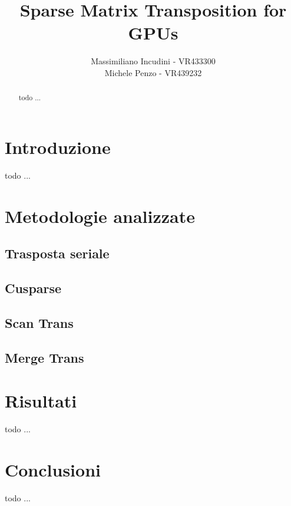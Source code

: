\documentclass[]{IEEEtran}
\title{Sparse Matrix Transposition for GPUs}
\author{Massimiliano Incudini - VR433300\\Michele Penzo - VR439232}
\begin{document}
\maketitle

\begin{abstract}
todo ...
\end{abstract}


\section{Introduzione}
todo ...

\section{Metodologie analizzate}
\subsection{Trasposta seriale}

\subsection{Cusparse}

\subsection{Scan Trans}

\subsection{Merge Trans}


\section{Risultati}
todo ...

\section{Conclusioni}
todo ...


%
%

\appendix
\end{document}
